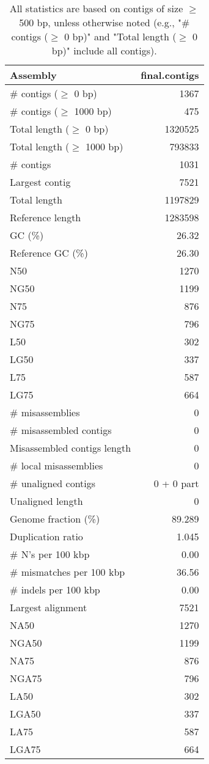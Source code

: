 \documentclass[12pt,a4paper]{article}
\begin{document}
\begin{table}[ht]
\begin{center}
\caption{All statistics are based on contigs of size $\geq$ 500 bp, unless otherwise noted (e.g., "\# contigs ($\geq$ 0 bp)" and "Total length ($\geq$ 0 bp)" include all contigs).}
\begin{tabular}{|l*{1}{|r}|}
\hline
Assembly & final.contigs \\ \hline
\# contigs ($\geq$ 0 bp) & 1367 \\ \hline
\# contigs ($\geq$ 1000 bp) & 475 \\ \hline
Total length ($\geq$ 0 bp) & 1320525 \\ \hline
Total length ($\geq$ 1000 bp) & 793833 \\ \hline
\# contigs & 1031 \\ \hline
Largest contig & 7521 \\ \hline
Total length & 1197829 \\ \hline
Reference length & 1283598 \\ \hline
GC (\%) & 26.32 \\ \hline
Reference GC (\%) & 26.30 \\ \hline
N50 & 1270 \\ \hline
NG50 & 1199 \\ \hline
N75 & 876 \\ \hline
NG75 & 796 \\ \hline
L50 & 302 \\ \hline
LG50 & 337 \\ \hline
L75 & 587 \\ \hline
LG75 & 664 \\ \hline
\# misassemblies & 0 \\ \hline
\# misassembled contigs & 0 \\ \hline
Misassembled contigs length & 0 \\ \hline
\# local misassemblies & 0 \\ \hline
\# unaligned contigs & 0 + 0 part \\ \hline
Unaligned length & 0 \\ \hline
Genome fraction (\%) & 89.289 \\ \hline
Duplication ratio & 1.045 \\ \hline
\# N's per 100 kbp & 0.00 \\ \hline
\# mismatches per 100 kbp & 36.56 \\ \hline
\# indels per 100 kbp & 0.00 \\ \hline
Largest alignment & 7521 \\ \hline
NA50 & 1270 \\ \hline
NGA50 & 1199 \\ \hline
NA75 & 876 \\ \hline
NGA75 & 796 \\ \hline
LA50 & 302 \\ \hline
LGA50 & 337 \\ \hline
LA75 & 587 \\ \hline
LGA75 & 664 \\ \hline
\end{tabular}
\end{center}
\end{table}
\end{document}
